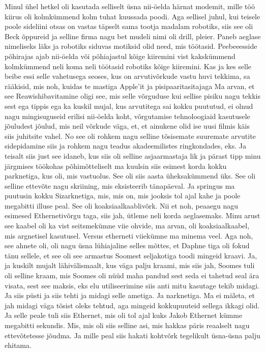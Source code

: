 Minul ühel hetkel oli kasutada selliselt üsna nii-öelda härnat modemit, mille töö kiirus oli kolmkümmend kolm tuhat kuussada poodi. Aga sellisel juhul, kui teisele poole sideliini otsas on vastas täpselt sama tootja madalam robotiks, siis see oli Beck õppureid ja selline firma nagu bet mudeli nimi oli drill, pleier. Paneb aeglase nimeliseks läks ja robotiks siduvas motiksid olid need, mis töötasid. Peebeeesside põhirajas ajab nii-öelda või põhiajastul kõige kiiremini vist kakskümmend kolmkümmend neli koma neli töötasid robotiks kõige kiiremini.
Kas ja kes selle beibe essi selle vahetusega seoses, kus on arvutivõrkude vastu huvi tekkima, sa rääkisid, mis noh, kuidas te mastiga Apple'it ja pisipaaritasitajaga
Ma arvan, et see Reawishibavitamine oligi see, mis selle võrguduse kui sellise pisiku nagu tekkis sest ega tippis ega ka kuskil mujal, kus arvutitega sai kokku puututud, ei olnud nagu mingisuguseid erilisi nii-öelda koht, võrgutamise tehnoloogiaid kasutusele jõuludest jõulud, mis neil võrkude väga, et, et ainukene olid ise uusi filmis käis siis juhitsite vahel. No see oli rohkem nagu selline tõsisemate suuremate arvutite sidepidamine siis ja rohkem nagu teadus akadeemilistes ringkondades, eks. Ja teisalt siis just see idaneb, kus siis oli selline asjaarmastaja lik ja pärast tipp minu järgmises töökohas põhimõtteliselt ma kuulsin siis esimest korda kokku parknetiga, kus oli, mis vastuolus. See oli siis aasta üheksakümmend üks. See oli selline ettevõte nagu skriining, mis eksisteerib tänapäeval. Ja springus ma puutusin kokku Sizarknetiga, mis, mis on, mis jooksis tol ajal kahe ja poole megabitti illuse peal. See oli koaksiaalkaablivõrk. Nii et noh, peaaegu nagu esimesed Ethernetivõrgu taga, siis jah, ütleme neli korda aeglasemaks. Minu arust see kaabel oli ka vist seitsmekümne viie ohvide, ma arvan, oli koaksiaalkaabel, mis argnetisel kasutusel.
Versus etherneti viiekümne ma minema veel. Aga noh, see ahnete oli, oli nagu üsna lühiajaline selles mõttes, et Daphne tiga oli fokud tänu sellele, et see oli see armastus Soomest seljakotiga toodi mingeid kraavi. Ja, ja kuskilt mujalt lähivälismaalt, kus väga palju kraami, mis siis jah, Soomes tuli oli selline kraam, mis Soomes oli nüüd maha pandud sest seda ei tahetud seal ära visata, sest see maksis, eks elu utiliseerimine siis anti mitu kasutage tekib midagi. Ja siis püsti ja siis tehti ja midagi selle ametiga. Ja narknetiga. Ma ei mäleta, et jah midagi väga tõsist oleks tehtud, aga mingeid kokkupuuteid sellega ikkagi olid. Ja selle peale tuli siis Ethernet, mis oli tol ajal kuks Jakob Ethernet kümme megabitti sekundis. Mis, mis oli siis selline asi, mis hakkas päris reaalselt nagu ettevõtetesse jõudma. Ja mille peal siis hakati kohtvõrk tegelikult üsna-üsna palju ehitama.
